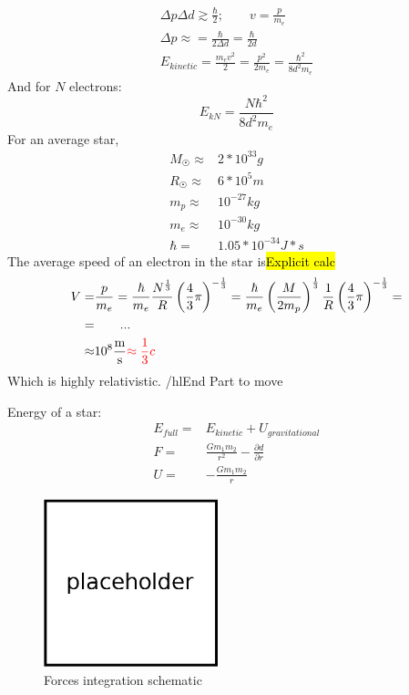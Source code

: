 			\begin{align}
				\Delta p \Delta d \gtrsim \frac{\hbar}{2}; \qquad v = \frac{p}{m_e} \\
				\Delta p \approx = \frac{\hbar}{2 \Delta d} = \frac{\hbar}{2 d} \\
				E_{kinetic} = \frac{m_ev^2}{2} = \frac{p^2}{2m_e} = \frac{\hbar^2}{8d^2m_e}
			\end{align}
			And for $N$ electrons:
			\begin{equation}
				E_{kN} = \frac{N\hbar^2}{8d^2m_e}
			\end{equation}
			For an average star,
			\begin{align}
				M_{\astrosun} \approx& 2*10^{33} \si{g} \\
				R_{\astrosun} \approx& 6*10^5 \si{m} \\
				m_p \approx& 10^{-27} \si{kg} \\
				m_e \approx& 10^{-30} \si{kg} \\
				\hbar =& 1.05 * 10^{-34} \si{J * s}
			\end{align}
			The average speed of an electron in the star is\hl{Explicit calc}
			\begin{align}
				V =& \frac{p}{m_e} = \frac{\hbar}{m_e} \frac{N^{\frac{1}{3}}}{R}\left(\frac{4}{3}\pi\right)^{-\frac{1}{3}} = \frac{\hbar}{m_e} \left( \frac{M}{2m_p}\right)^{\frac{1}{3}}\frac{1}{R}\left(\frac{4}{3}\pi\right)^{-\frac{1}{3}} =\\
				=& \qquad \text{...} \\
				\approx& 10^8 \si{\frac{m}{s}} \hl{\approx \frac{1}{3}c}
			\end{align}
			Which is highly relativistic. /hl{End Part to move}
			
			Energy of a star:
			\begin{align}
				E_{full} =& E_{kinetic} + U_{gravitational} \\
				F =& \frac{G m_1 m_2}{r^2}  - \frac{\partial d}{\partial r} \\
				U =& - \frac{G m_1 m_2}{r}
			\end{align}
		
			\begin{figure}[!h]
				\centering
				\includegraphics[width=0.45\textwidth]{./figs/placeholder.eps}
				\caption{Forces integration schematic}
				\label{starintegration}
			\end{figure}
		
